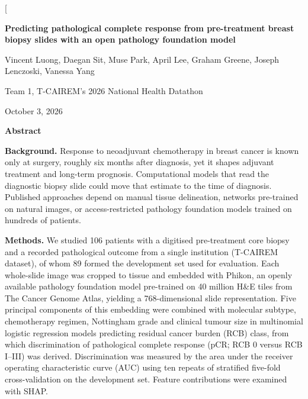\documentclass[10pt,a4paper,twocolumn]{article}
\begin{document}
\twocolumn[{%
\begin{center}
{\LARGE\bfseries Predicting pathological complete response from pre-treatment breast biopsy slides with an open pathology foundation model\par}
\vspace{1em}
{\large Vincent Luong, Daegan Sit, Muse Park, April Lee, Graham Greene, Joseph Lenczoski, Vanessa Yang\par}
\vspace{0.3em}
{\small Team 1, T-CAIREM's 2026 National Health Datathon\par}
\vspace{0.3em}
{\small October 3, 2026\par}
\vspace{1em}
\begin{minipage}{0.9\textwidth}
\small
\setlength{\parindent}{0pt}\setlength{\parskip}{0.4em}
\centerline{\textbf{Abstract}}
\vspace{0.2em}
\textbf{Background.} Response to neoadjuvant chemotherapy in breast cancer is known only at surgery, roughly six months after diagnosis, yet it shapes adjuvant treatment and long-term prognosis. Computational models that read the diagnostic biopsy slide could move that estimate to the time of diagnosis. Published approaches depend on manual tissue delineation, networks pre-trained on natural images, or access-restricted pathology foundation models trained on hundreds of patients.

\textbf{Methods.} We studied 106 patients with a digitised pre-treatment core biopsy and a recorded pathological outcome from a single institution (T-CAIREM dataset), of whom 89 formed the development set used for evaluation. Each whole-slide image was cropped to tissue and embedded with Phikon, an openly available pathology foundation model pre-trained on 40 million H\&E tiles from The Cancer Genome Atlas, yielding a 768-dimensional slide representation. Five principal components of this embedding were combined with molecular subtype, chemotherapy regimen, Nottingham grade and clinical tumour size in multinomial logistic regression models predicting residual cancer burden (RCB) class, from which discrimination of pathological complete response (pCR; RCB 0 versus RCB I--III) was derived. Discrimination was measured by the area under the receiver operating characteristic curve (AUC) using ten repeats of stratified five-fold cross-validation on the development set. Feature contributions were examined with SHAP.


\end{minipage}
\end{center}}
\end{document}
